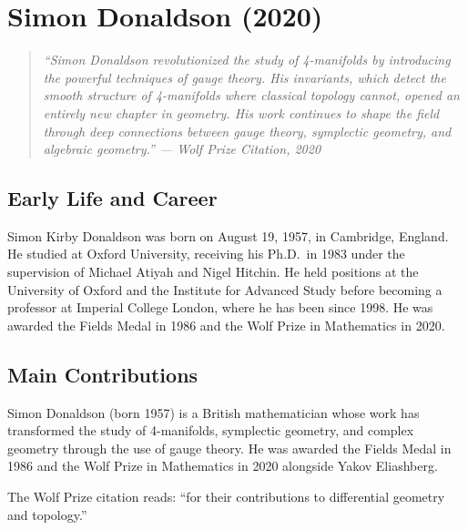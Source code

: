 \providecommand{\Spin}{\operatorname{Spin}}
\providecommand{\Holder}{\operatorname{Holder}}
\let\C\relax
\newcommand{\C}{\mathbb{C}}

\chapter{Simon Donaldson (2020)}

\begin{quote}
\it ``Simon Donaldson revolutionized the study of 4-manifolds by introducing the powerful techniques of gauge theory. His invariants, which detect the smooth structure of 4-manifolds where classical topology cannot, opened an entirely new chapter in geometry. His work continues to shape the field through deep connections between gauge theory, symplectic geometry, and algebraic geometry.'' --- Wolf Prize Citation, 2020
\end{quote}

\section{Early Life and Career}

Simon Kirby Donaldson was born on August 19, 1957, in Cambridge, England. He studied at Oxford University, receiving his Ph.D.\ in 1983 under the supervision of Michael Atiyah and Nigel Hitchin. He held positions at the University of Oxford and the Institute for Advanced Study before becoming a professor at Imperial College London, where he has been since 1998. He was awarded the Fields Medal in 1986 and the Wolf Prize in Mathematics in 2020.

\section{Main Contributions}

Simon Donaldson (born 1957) is a British mathematician whose work has transformed the study of 4-manifolds, symplectic geometry, and complex geometry through the use of gauge theory. He was awarded the Fields Medal in 1986 and the Wolf Prize in Mathematics in 2020 alongside Yakov Eliashberg.

The Wolf Prize citation reads: ``for their contributions to differential geometry and topology.''

